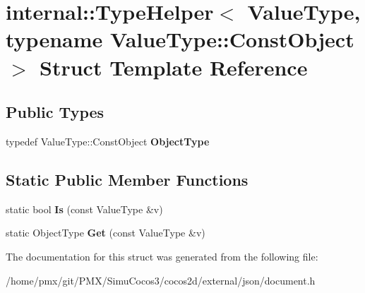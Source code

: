 \hypertarget{structinternal_1_1TypeHelper_3_01ValueType_00_01typename_01ValueType_1_1ConstObject_01_4}{}\section{internal\+:\+:Type\+Helper$<$ Value\+Type, typename Value\+Type\+:\+:Const\+Object $>$ Struct Template Reference}
\label{structinternal_1_1TypeHelper_3_01ValueType_00_01typename_01ValueType_1_1ConstObject_01_4}
\subsection*{Public Types}
\begin{DoxyCompactItemize}
\item 
\mbox{\label{structinternal_1_1TypeHelper_3_01ValueType_00_01typename_01ValueType_1_1ConstObject_01_4_a986df6ac09ceb6cc9ba9fd4d73e90495}} 
typedef Value\+Type\+::\+Const\+Object {\bfseries Object\+Type}
\end{DoxyCompactItemize}
\subsection*{Static Public Member Functions}
\begin{DoxyCompactItemize}
\item 
\mbox{\label{structinternal_1_1TypeHelper_3_01ValueType_00_01typename_01ValueType_1_1ConstObject_01_4_a843e707732c55f2178d399a0af13605a}} 
static bool {\bfseries Is} (const Value\+Type \&v)
\item 
\mbox{\label{structinternal_1_1TypeHelper_3_01ValueType_00_01typename_01ValueType_1_1ConstObject_01_4_ae6a797157c9b3d15ca4a32c48ea4bc73}} 
static Object\+Type {\bfseries Get} (const Value\+Type \&v)
\end{DoxyCompactItemize}


The documentation for this struct was generated from the following file\+:\begin{DoxyCompactItemize}
\item 
/home/pmx/git/\+P\+M\+X/\+Simu\+Cocos3/cocos2d/external/json/document.\+h\end{DoxyCompactItemize}
